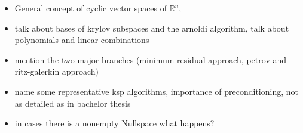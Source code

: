         \begin{itemize}
          \item General concept of cyclic vector spaces of \(\mathbb{R}^n\), 
          \item talk about bases of krylov subspaces and the arnoldi algorithm, talk about polynomials and linear combinations
          \item mention the two major branches (minimum residual approach, petrov and ritz-galerkin approach) 
          \item name some representative ksp algorithms, importance of preconditioning, not as detailed as in bachelor thesis
          \item in cases there is a nonempty Nullspace what happens?
        \end{itemize}

